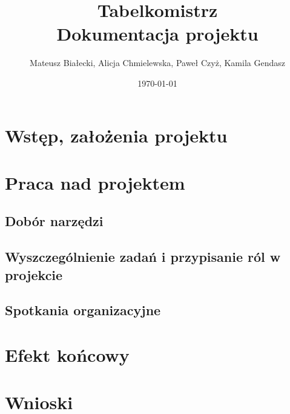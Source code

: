 \documentclass[12pt,a4paper]{article}
\author{Mateusz Białecki, Alicja Chmielewska, Paweł Czyż, Kamila Gendasz}
\title{Tabelkomistrz \\ [2ex] \LARGE Dokumentacja projektu}
\date{\today}
\begin{document}
\clearpage

\maketitle

\newpage

\tableofcontents
\newpage

\section{Wstęp, założenia projektu}

\section{Praca nad projektem}

\subsection{Dobór narzędzi}
\subsection{Wyszczególnienie zadań i przypisanie ról w projekcie}
\subsection{Spotkania organizacyjne}
\section{Efekt końcowy}
\section{Wnioski}
\newpage

\newpage


\end{document}
